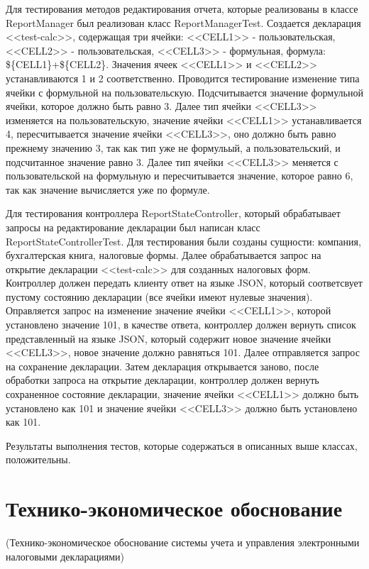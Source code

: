 \documentclass[14pt,a4paper]{reportmod}
\begin{document}
Для тестирования методов редактирования отчета, которые реализованы в классе ReportManager был реализован класс ReportManagerTest. Создается декларация <<test-calc>>, содержащая три ячейки: <<CELL1>> - пользовательская, <<CELL2>> - пользовательская, <<CELL3>> - формульная, формула: \$\{CELL1\}+\$\{CELL2\}. Значения ячеек <<CELL1>> и <<CELL2>> устанавливаются 1 и 2 соответственно. Проводится тестирование изменение типа ячейки с формульной на пользовательскую. Подсчитывается значение формульной ячейки, которое должно быть равно 3. Далее тип ячейки <<CELL3>> изменяется на пользовательскую, значение ячейки <<CELL1>> устанавливается 4, пересчитывается значение ячейки <<CELL3>>, оно должно быть равно прежнему значению 3, так как тип уже не формульый, а пользовательский, и подсчитанное значение равно 3. Далее тип ячейки <<CELL3>> меняется с пользовательской на формульную и пересчитывается значение, которое равно 6, так как значение вычисляется уже по формуле.


Для тестирования контроллера ReportStateController, который обрабатывает запросы на редактирование декларации был написан класс ReportStateControllerTest. Для тестирования были созданы сущности: компания, бухгалтерская книга, налоговые формы. Далее обрабатывается запрос на открытие декларации <<test-calc>> для созданных налоговых форм. Контроллер должен передать клиенту ответ на языке JSON, который соответсвует пустому состоянию декларации (все ячейки имеют нулевые значения). Оправляется запрос на изменение значение ячейки <<CELL1>>, которой установлено значение 101, в качестве ответа, контроллер должен вернуть список представленный на языке JSON, который содержит новое значение ячейки <<CELL3>>, новое значение должно равняться 101. Далее отправляется запрос на сохранение декларации. Затем декларация открывается заново, после обработки запроса на открытие декларации, контроллер должен вернуть сохраненное состояние декларации, значение ячейки <<CELL1>> должно быть установлено как 101 и значение ячейки <<CELL3>> должно быть установлено как 101.


Результаты  выполнения тестов, которые содержаться в описанных выше классах, положительны.

\chapter{Технико-экономическое обоснование}
(Технико-экономическое обоснование системы учета и управления электронными налоговыми декларациями)
\end{document}
